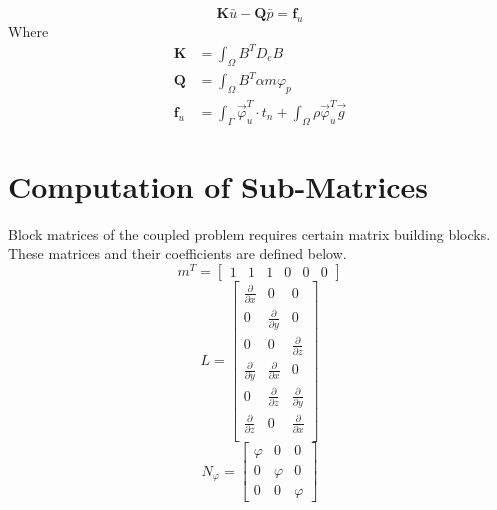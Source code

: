 \documentclass[12pt]{article}
\begin{document}
\newline
\begin{equation}	\label{eq30a}
\textbf{K}\bar{u}-\textbf{Q}\bar{p} = \textbf{f}_u
\end{equation}
\newline
Where
%
\begin{equation}
\begin{split}
\textbf{K} &= \int_\Omega B^TD_eB	\\
\textbf{Q} &= \int_\Omega B^T\alpha m \varphi_p	\\
\textbf{f}_u &= \int_\Gamma\vec{\varphi}^T_u\cdot t_n+\int_\Omega\rho\vec{\varphi}^T_u\vec{g}
\end{split}
\end{equation}
\newline
\section{Computation of Sub-Matrices}
Block matrices of the coupled problem requires certain matrix building blocks. These matrices and their coefficients are defined below.
%
\begin{equation}	\label{eq42b}
m^T=\left[
\begin{array}{cccccc}
1&1&1&0&0&0
\end{array}
\right]
\end{equation}
%
\begin{equation}	\label{eq43}
L = \left[
\begin{array}{ccc}
\frac{\partial}{\partial x} & 0 & 0  			\\
0 &\frac{\partial}{\partial y} & 0  				\\
0 & 0 &\frac{\partial}{\partial z} 				\\
\frac{\partial}{\partial y} & \frac{\partial}{\partial x} & 0  			\\
0 & \frac{\partial}{\partial z} & \frac{\partial}{\partial y}  			\\
\frac{\partial}{\partial z} & 0 & \frac{\partial}{\partial x}  			\\
\end{array}
\right]
\end{equation}
%
\begin{equation}	\label{eq44}
N_{\varphi} =\left[
\begin{array}{ccc}
\varphi & 0 & 0  			\\
0 &\varphi & 0  				\\
0 & 0 &\varphi				
\end{array}
\right]
\end{equation}
\end{document}
